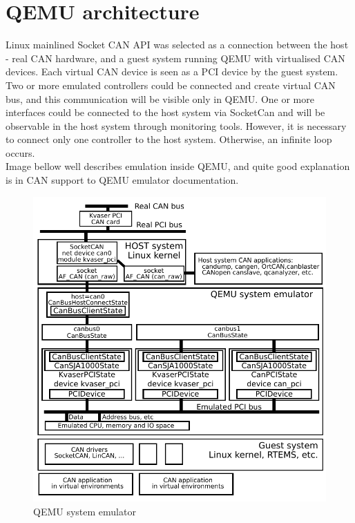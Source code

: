 \documentclass{ctuthesis}
\begin{document}
 \section{QEMU architecture}
  Linux mainlined Socket CAN API was selected as a connection between the host - real CAN hardware, and a guest system running QEMU with virtualised CAN devices. Each virtual CAN device is seen as a PCI device by the guest system. \\
  Two or more emulated controllers could be connected and create virtual CAN bus, and this communication will be visible only in QEMU. One or more interfaces could be connected to the host system via SocketCan and will be observable in the host system through monitoring tools. However, it is necessary to connect only one controller to the host system. Otherwise, an infinite loop occurs. \\
  Image bellow well describes emulation inside QEMU, and quite good explanation is in CAN support to QEMU emulator documentation. \cite[page 2-4]{qemu-mainline}
  \begin{figure}[H]
  \includegraphics[width=1\textwidth]{qemu-can-bus}
  \caption{QEMU system emulator \cite{qemu-canbusexplain}}
  \end{figure}
 
\end{document}
